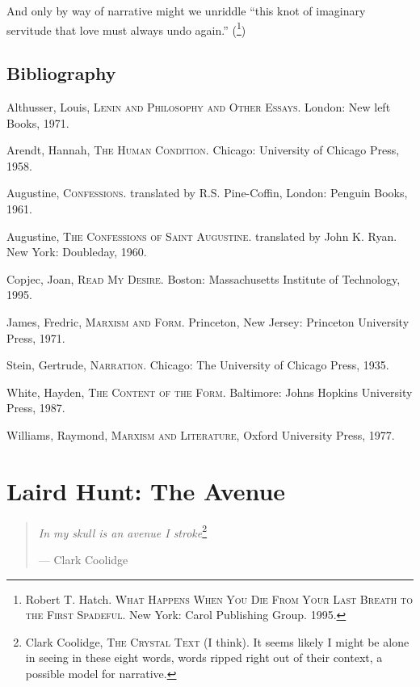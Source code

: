 \documentclass[
]{memoir}
\begin{document}
And only by way of narrative might we unriddle ``this knot of imaginary
servitude that love must always undo again.'' (\footnote{Robert T.
  Hatch. \textsc{What Happens When You Die From Your Last Breath to the
  First Spadeful}. New York: Carol Publishing Group. 1995.})

\hypertarget{bibliography}{%
\section*{Bibliography}\label{bibliography}}

Althusser, Louis, \textsc{Lenin and Philosophy and Other Essays}.
London: New left Books, 1971.

Arendt, Hannah, \textsc{The Human Condition}. Chicago: University of
Chicago Press, 1958.

Augustine, \textsc{Confessions}. translated by R.S. Pine-Coffin, London:
Penguin Books, 1961.

Augustine, \textsc{The Confessions of Saint Augustine}. translated by
John K. Ryan. New York: Doubleday, 1960.

Copjec, Joan, \textsc{Read My Desire}. Boston: Massachusetts Institute
of Technology, 1995.

James, Fredric, \textsc{Marxism and Form}. Princeton, New Jersey:
Princeton University Press, 1971.

Stein, Gertrude, \textsc{Narration}. Chicago: The University of Chicago
Press, 1935.

White, Hayden, \textsc{The Content of the Form}. Baltimore: Johns
Hopkins University Press, 1987.

Williams, Raymond, \textsc{Marxism and Literature}, Oxford University
Press, 1977.

\hypertarget{laird-hunt-the-avenue}{%
\chapter{Laird Hunt: The Avenue}\label{laird-hunt-the-avenue}}

\begin{quote}
\emph{In my skull is an avenue I stroke}\footnote{Clark Coolidge,
  \textsc{The Crystal Text} (I think). It seems likely I might be alone
  in seeing in these eight words, words ripped right out of their
  context, a possible model for narrative.}

--- Clark Coolidge
\end{quote}
\end{document}
